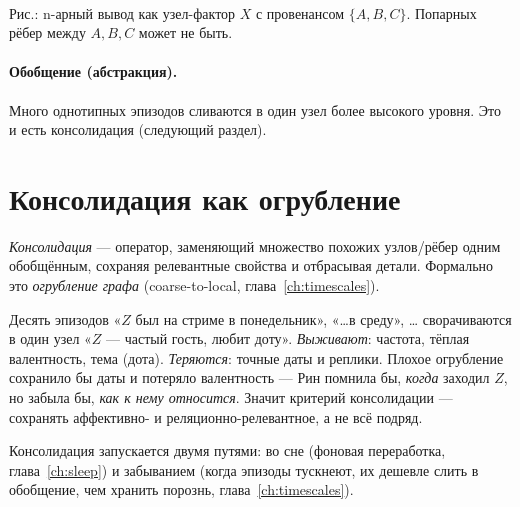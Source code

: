 \begin{center}
\\[2pt]
{\small Рис.: n-арный вывод как узел-фактор $X$ с провенансом $\{A,B,C\}$.
Попарных рёбер между $A,B,C$ может не быть.}
\end{center}

\paragraph{Обобщение (абстракция).} Много однотипных эпизодов сливаются в один узел
более высокого уровня. Это и есть консолидация (следующий раздел).

\section{Консолидация как огрубление}

\begin{definition}
\emph{Консолидация} — оператор, заменяющий множество похожих узлов/рёбер одним
обобщённым, сохраняя релевантные свойства и отбрасывая детали. Формально это
\emph{огрубление графа} (coarse-to-local, глава~\ref{ch:timescales}).
\end{definition}

\begin{workedbox}
Десять эпизодов «$Z$ был на стриме в понедельник», «\ldots в среду», \ldots
сворачиваются в один узел «$Z$ — частый гость, любит доту». \emph{Выживают}:
частота, тёплая валентность, тема (дота). \emph{Теряются}: точные даты и реплики.
Плохое огрубление сохранило бы даты и потеряло валентность — Рин помнила бы,
\emph{когда} заходил $Z$, но забыла бы, \emph{как к нему относится}. Значит критерий
консолидации — сохранять аффективно- и реляционно-релевантное, а не всё подряд.
\end{workedbox}

Консолидация запускается двумя путями: во сне (фоновая переработка,
глава~\ref{ch:sleep}) и забыванием (когда эпизоды тускнеют, их дешевле слить в
обобщение, чем хранить порознь, глава~\ref{ch:timescales}).

